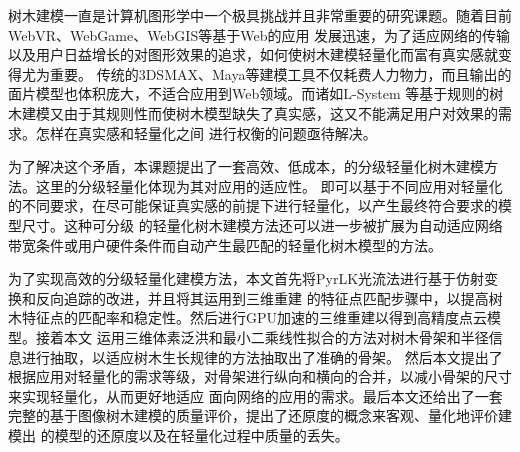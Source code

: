 


\makeatletter
  \iftongji@doctor
  \else
    \iftongji@master
    \fi
  \fi

\makeatother








\cassosupervisor{}

\ccosupervisor{}

\begin{cabstract}
树木建模一直是计算机图形学中一个极具挑战并且非常重要的研究课题。随着目前WebVR、WebGame、WebGIS等基于Web的应用
发展迅速，为了适应网络的传输以及用户日益增长的对图形效果的追求，如何使树木建模轻量化而富有真实感就变得尤为重要。
传统的3DSMAX、Maya等建模工具不仅耗费人力物力，而且输出的面片模型也体积庞大，不适合应用到Web领域。而诸如L-System
等基于规则的树木建模又由于其规则性而使树木模型缺失了真实感，这又不能满足用户对效果的需求。怎样在真实感和轻量化之间
进行权衡的问题亟待解决。

为了解决这个矛盾，本课题提出了一套高效、低成本，的分级轻量化树木建模方法。这里的分级轻量化体现为其对应用的适应性。
即可以基于不同应用对轻量化的不同要求，在尽可能保证真实感的前提下进行轻量化，以产生最终符合要求的模型尺寸。这种可分级
的轻量化树木建模方法还可以进一步被扩展为自动适应网络带宽条件或用户硬件条件而自动产生最匹配的轻量化树木模型的方法。

为了实现高效的分级轻量化建模方法，本文首先将PyrLK光流法进行基于仿射变换和反向追踪的改进，并且将其运用到三维重建
的特征点匹配步骤中，以提高树木特征点的匹配率和稳定性。然后进行GPU加速的三维重建以得到高精度点云模型。接着本文
运用三维体素泛洪和最小二乘线性拟合的方法对树木骨架和半径信息进行抽取，以适应树木生长规律的方法抽取出了准确的骨架。
然后本文提出了根据应用对轻量化的需求等级，对骨架进行纵向和横向的合并，以减小骨架的尺寸来实现轻量化，从而更好地适应
面向网络的应用的需求。最后本文还给出了一套完整的基于图像树木建模的质量评价，提出了还原度的概念来客观、量化地评价建模出
的模型的还原度以及在轻量化过程中质量的丢失。
\end{cabstract}

